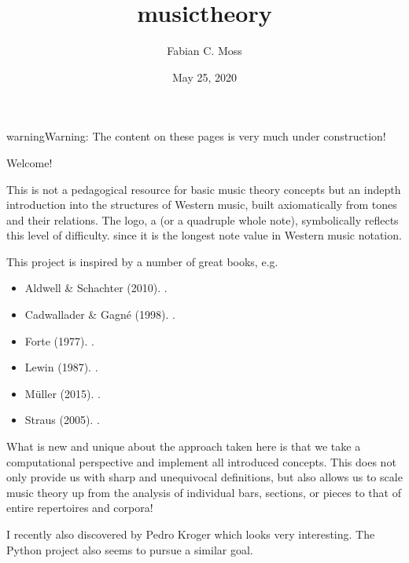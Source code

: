 \documentclass[letterpaper,10pt,english]{sphinxmanual}
\title{musictheory}
\date{May 25, 2020}
\author{Fabian C.\@{} Moss}
\begin{document}
\pagestyle{empty}
\sphinxmaketitle
\pagestyle{plain}
\sphinxtableofcontents
\pagestyle{normal}
\label{\detokenize{index::doc}}


\begin{sphinxadmonition}{warning}{Warning:}
The content on these pages is very much under construction!
\end{sphinxadmonition}

Welcome!

This is not a pedagogical resource for basic music theory concepts
but an in\sphinxhyphen{}depth introduction into the structures of Western music,
built axiomatically from tones and their relations.
The logo, a  (or a quadruple whole note),
symbolically reflects this level of difficulty. since it is the longest
note value in Western music notation.

This project is inspired by a number of great books, e.g.
\begin{itemize}
\item {} 
Aldwell \& Schachter (2010). .

\item {} 
Cadwallader \& Gagné (1998). .

\item {} 
Forte (1977). .

\item {} 
Lewin (1987). .

\item {} 
Müller (2015). .

\item {} 
Straus (2005). .

\end{itemize}

What is new and unique about the approach taken here is that we take
a computational perspective and implement all introduced concepts.
This does not only provide us with sharp and unequivocal definitions,
but also allows us to scale music theory up from the analysis of individual
bars, sections, or pieces to that of entire repertoires and corpora!

I recently also discovered  by Pedro Kroger
which looks very interesting.
The Python project  also seems to pursue a similar goal.
\end{document}
